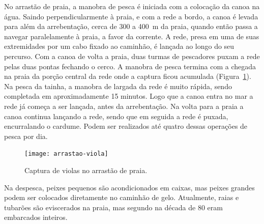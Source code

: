 \documentclass[a4paper,11pt,twoside,showtrims,onecolumn,openright,final]{memoir}
\begin{document}
No arrastão de praia, a manobra de pesca é iniciada com a colocação da canoa na água. 
Saindo perpendicularmente à praia, e com a rede a bordo, a canoa é levada para 
além da arrebentação, cerca de 300 a 400~m da praia, quando então passa a navegar paralelamente 
à praia, a favor da corrente. A rede, presa em uma de suas extremidades por um cabo 
fixado ao caminhão, é lançada ao longo do seu percurso. Com a canoa de volta a praia, 
duas turmas de pescadores puxam a rede pelas duas pontas fechando 
o cerco. %
A manobra de pesca termina com a chegada na praia 
da porção central da rede onde a captura ficou acumulada (Figura~\ref{foto:arrastao-viola}). 
Na pesca da tainha, 
a manobra de largada da rede é muito rápida, sendo completada em aproximadamente 15 minutos. 
Logo que a canoa entra no mar a rede já começa a ser lançada, antes da arrebentação. Na 
volta para a praia a canoa continua lançando a rede, sendo que em seguida a rede é puxada, 
encurralando o cardume. 
Podem ser realizados até quatro dessas operações de pesca por dia.







\begin{figure}
\begin{center}
\texttt{[image: arrastao-viola]}
\end{center}
\caption{Captura de violas no arrastão de praia.}
\label{foto:arrastao-viola}
\end{figure}


Na despesca, peixes pequenos são acondicionados em caixas, mas peixes grandes
podem ser colocados diretamente no caminhão de gelo. Atualmente, raias e tubarões são 
eviscerados na praia, mas segundo \citet{lessa1982} na década de 80 eram embarcados inteiros.
\end{document}
